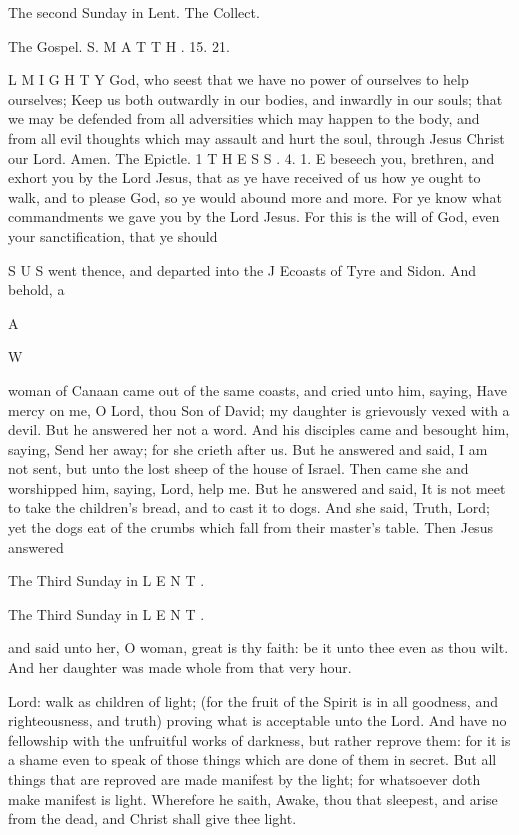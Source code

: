 The second Sunday in Lent. The Collect.

The Gospel. S. M A T T H . 15. 21.

L M I G H T Y God, who seest that we have no power of ourselves to help ourselves; Keep us both outwardly in our bodies, and inwardly in our souls; that we may be defended from all adversities which may happen to the body, and from all evil thoughts which may assault and hurt the soul, through Jesus Christ our Lord. Amen. The Epictle. 1 T H E S S . 4. 1. E beseech you, brethren, and exhort you by the Lord Jesus, that as ye have received of us how ye ought to walk, and to please God, so ye would abound more and more. For ye know what commandments we gave you by the Lord Jesus. For this is the will of God, even your sanctification, that ye should

S U S went thence, and departed into the J Ecoasts of Tyre and Sidon. And behold, a

A

W

woman of Canaan came out of the same coasts, and cried unto him, saying, Have mercy on me, O Lord, thou Son of David; my daughter is grievously vexed with a devil. But he answered her not a word. And his disciples came and besought him, saying, Send her away; for she crieth after us. But he answered and said, I am not sent, but unto the lost sheep of the house of Israel. Then came she and worshipped him, saying, Lord, help me. But he answered and said, It is not meet to take the children's bread, and to cast it to dogs. And she said, Truth, Lord; yet the dogs eat of the crumbs which fall from their master’s table. Then Jesus answered

The Third Sunday in L E N T .

The Third Sunday in L E N T .

and said unto her, O woman, great is thy faith: be it unto thee even as thou wilt. And her daughter was made whole from that very hour.

Lord: walk as children of light; (for the fruit of the Spirit is in all goodness, and righteousness, and truth) proving what is acceptable unto the Lord. And have no fellowship with the unfruitful works of darkness, but rather reprove them: for it is a shame even to speak of those things which are done of them in secret. But all things that are reproved are made manifest by the light; for whatsoever doth make manifest is light. Wherefore he saith, Awake, thou that sleepest, and arise from the dead, and Christ shall give thee light.

